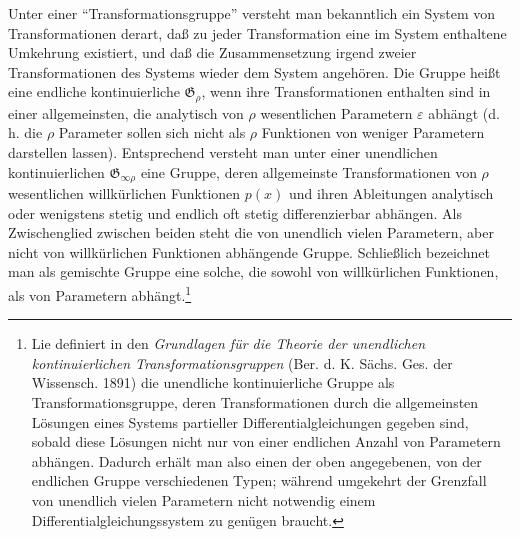 \documentclass[11pt]{article}
\newcommand{\G}{\mathfrak G}
\newcommand{\eps}{\varepsilon}
\begin{document}
Unter einer ``Transformationsgruppe'' versteht man bekanntlich ein System von Transformationen derart, daß zu jeder Transformation eine im System enthaltene Umkehrung existiert, und daß die Zusammensetzung irgend zweier Transformationen des Systems wieder dem System angehören. Die Gruppe heißt eine endliche kontinuierliche \(\G_\rho\), wenn ihre Transformationen enthalten sind in einer allgemeinsten, die analytisch von \(\rho\) wesentlichen Parametern \(\eps\) abhängt (d.\,h. die \(\rho\) Parameter sollen sich nicht als \(\rho\) Funktionen von weniger Parametern darstellen lassen). Entsprechend versteht man unter einer unendlichen kontinuierlichen \(\G_{\infty\rho}\) eine Gruppe, deren allgemeinste Transformationen von \(\rho\) wesentlichen willkürlichen Funktionen \(p(x)\) und ihren Ableitungen analytisch oder wenigstens stetig und endlich oft stetig differenzierbar abhängen. Als Zwischenglied zwischen beiden steht die von unendlich vielen Parametern, aber nicht von willkürlichen Funktionen abhängende Gruppe. Schließlich bezeichnet man als gemischte Gruppe eine solche, die sowohl von willkürlichen Funktionen, als von Parametern abhängt.\footnote{Lie definiert in den \emph{Grundlagen für die Theorie der unendlichen kontinuierlichen Transformationsgruppen} (Ber. d. K. Sächs. Ges. der Wissensch. 1891) die unendliche kontinuierliche Gruppe als Transformationsgruppe, deren Transformationen durch die allgemeinsten Lösungen eines Systems partieller Differentialgleichungen gegeben sind, sobald diese Lösungen nicht nur von einer endlichen Anzahl von Parametern abhängen. Dadurch erhält man also einen der oben angegebenen, von der endlichen Gruppe verschiedenen Typen; während umgekehrt der Grenzfall von unendlich vielen Parametern nicht notwendig einem Differentialgleichungssystem zu genügen braucht.}
\end{document}
